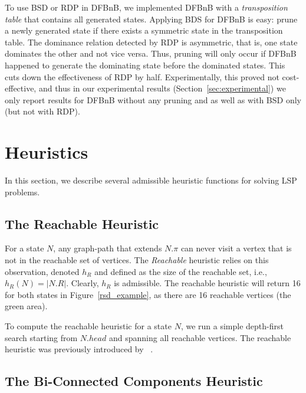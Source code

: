 \documentclass[letterpaper]{article} %
\newcommand{\inlinecite}[1]{\citeauthor{#1} \shortcite{#1}}
\begin{document}
To use BSD or RDP in DFBnB, we implemented DFBnB with a \emph{transposition table} that contains all generated states. Applying BDS for DFBnB is easy: prune a newly generated state if there exists a symmetric state in the transposition table. 
The dominance relation detected by RDP is asymmetric, that is, one state dominates the other and not vice versa. Thus, pruning will only occur if DFBnB happened to generate the dominating state before the dominated states. This cuts down the effectiveness of RDP by half. Experimentally, this proved not cost-effective, and thus in our experimental results (Section~\ref{sec:experimental}) we only report results for DFBnB without any pruning and as well as with BSD only (but not with RDP).





\section{Heuristics}
\label{sec:heuristics}
In this section, we describe several admissible heuristic functions for solving LSP problems. %

\subsection{The Reachable Heuristic}

For a state $N$, any graph-path that extends $N.\pi$ can never visit a vertex that is not in the reachable set of vertices. The \emph{Reachable} heuristic relies on this observation, denoted $h_{R}$ 
and defined as the size of the reachable set, i.e., $h_R(N)=|N.R|$. Clearly, $h_R$ is admissible. 
The reachable heuristic will return 16 for both states in Figure~\ref{rsd_example}, as there are 16 reachable vertices (the green area). 

To compute the reachable heuristic for a state $N$, we run a simple depth-first search starting from $N.head$ and spanning all reachable vertices. 
The reachable heuristic was previously introduced by~\inlinecite{DBLP:conf/socs/SternKPFR14}. 

\subsection{The Bi-Connected Components Heuristic}
\end{document}
